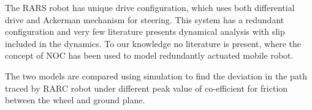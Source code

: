  The RARS robot has unique  drive configuration, which uses both differential drive and Ackerman mechanism for steering. 
 This system has a redundant configuration and very few literature presents dynamical analysis with slip included in the dynamics. To our knowledge no literature is present, where the concept of  NOC  has been used to model redundantly actuated mobile robot. 
 
The two models are compared using simulation to find the deviation in the path traced by RARC robot under different peak value of co-efficient for friction between the wheel and ground plane.
   


   
 
 

  
  
  
  
  
